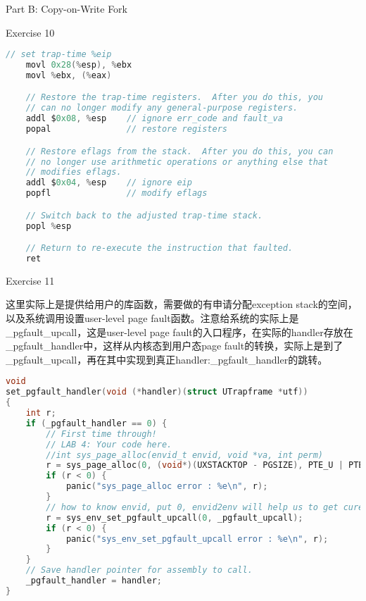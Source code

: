 \documentclass[GBK,winfonts,a4paper,10pt]{ctexart}
\begin{document}
\begin{section}{Part B: Copy-on-Write Fork}
\begin{subsection}{Exercise 10}
\begin{lstlisting}[language=C]
	// set trap-time %eip
	movl 0x28(%esp), %ebx
	movl %ebx, (%eax)

	// Restore the trap-time registers.  After you do this, you
	// can no longer modify any general-purpose registers.
	addl $0x08, %esp 	// ignore err_code and fault_va
	popal 				// restore registers

	// Restore eflags from the stack.  After you do this, you can
	// no longer use arithmetic operations or anything else that
	// modifies eflags.
	addl $0x04, %esp 	// ignore eip 
	popfl				// modify eflags

	// Switch back to the adjusted trap-time stack.
	popl %esp

	// Return to re-execute the instruction that faulted.
	ret
\end{lstlisting}
\end{subsection}

\begin{subsection}{Exercise 11}
\par
这里实际上是提供给用户的库函数，需要做的有申请分配exception stack的空间，以及系统调用设置user-level page fault函数。注意给系统的实际上是\_pgfault\_upcall，这是user-level page fault的入口程序，在实际的handler存放在\_pgfault\_handler中，这样从内核态到用户态page fault的转换，实际上是到了\_pgfault\_upcall，再在其中实现到真正handler:\_pgfault\_handler的跳转。
\begin{lstlisting}[language=C]
void
set_pgfault_handler(void (*handler)(struct UTrapframe *utf))
{
	int r;
	if (_pgfault_handler == 0) {
		// First time through!	
		// LAB 4: Your code here.
		//int sys_page_alloc(envid_t envid, void *va, int perm)
		r = sys_page_alloc(0, (void*)(UXSTACKTOP - PGSIZE), PTE_U | PTE_W | PTE_P);
		if (r < 0) {
			panic("sys_page_alloc error : %e\n", r);
		}
		// how to know envid, put 0, envid2env will help us to get curenv in syscall
		r = sys_env_set_pgfault_upcall(0, _pgfault_upcall);		
		if (r < 0) {
			panic("sys_env_set_pgfault_upcall error : %e\n", r);
		}
	}
	// Save handler pointer for assembly to call.
	_pgfault_handler = handler;
}
\end{lstlisting}
\end{subsection}

\end{section}
\end{document}
